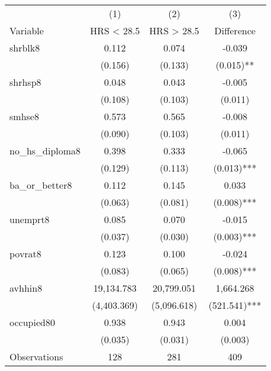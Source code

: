 \begin{tabular}{lccc}
\hline\hline
 & (1) & (2) & (3)   \\
Variable & HRS < 28.5 & HRS > 28.5 & Difference   \\
\hline
shrblk8&0.112&0.074&-0.039\\
&(0.156)&(0.133)&(0.015)**\\
shrhsp8&0.048&0.043&-0.005\\
&(0.108)&(0.103)&(0.011)\\
smhse8&0.573&0.565&-0.008\\
&(0.090)&(0.103)&(0.011)\\
no\_hs\_diploma8&0.398&0.333&-0.065\\
&(0.129)&(0.113)&(0.013)***\\
ba\_or\_better8&0.112&0.145&0.033\\
&(0.063)&(0.081)&(0.008)***\\
unemprt8&0.085&0.070&-0.015\\
&(0.037)&(0.030)&(0.003)***\\
povrat8&0.123&0.100&-0.024\\
&(0.083)&(0.065)&(0.008)***\\
avhhin8&19,134.783&20,799.051&1,664.268\\
&(4,403.369)&(5,096.618)&(521.541)***\\
occupied80&0.938&0.943&0.004\\
&(0.035)&(0.031)&(0.003)\\
\hline
Observations & 128 & 281 & 409  \\
\hline\hline
\end{tabular}
